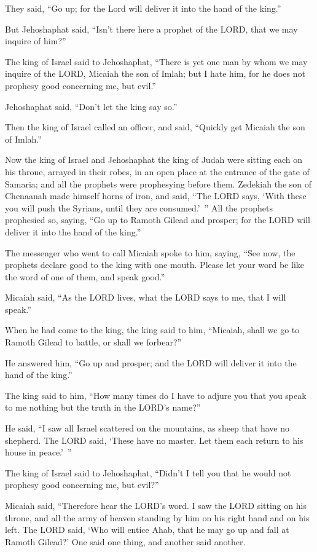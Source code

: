 They said, “Go up; for the Lord will deliver it into the hand of the king.”

\myverse{}But Jehoshaphat said, “Isn’t there here a prophet of the LORD,
that we may inquire of him?”

\myverse{}The king of Israel said to Jehoshaphat, “There is yet one man
by whom we may inquire of the LORD, Micaiah the son of Imlah; but I hate him, for he does not prophesy
good concerning me, but evil.”

Jehoshaphat said, “Don’t let the king say so.”

\myverse{}Then the king of Israel called an officer, and said, “Quickly
get Micaiah the son of Imlah.”

\myverse{}Now the king of Israel and Jehoshaphat the king of Judah were
sitting each on his throne, arrayed in their robes, in an open place at the entrance of the gate of Samaria;
and all the prophets were prophesying before them.
\myverse{}Zedekiah the son of Chenaanah made himself horns of iron, and said, “The
LORD says, ‘With these you will push the Syrians, until they are consumed.’ ”
\myverse{}All the prophets prophesied so, saying, “Go up to Ramoth Gilead and prosper;
for the LORD will deliver it into the hand of the king.”

\myverse{}The messenger who went to call Micaiah spoke to him, saying,
“See now, the prophets declare good to the king with one mouth. Please let your word be like the word
of one of them, and speak good.”

\myverse{}Micaiah said, “As the LORD lives, what the LORD says to me,
that I will speak.”

\myverse{}When he had come to the king, the king said to him, “Micaiah,
shall we go to Ramoth Gilead to battle, or shall we forbear?”

He answered him, “Go up and prosper; and the LORD will deliver it into the hand of the king.”

\myverse{}The king said to him, “How many times do I have to adjure you
that you speak to me nothing but the truth in the LORD’s name?”

\myverse{}He said, “I saw all Israel scattered on the mountains, as sheep
that have no shepherd. The LORD said, ‘These have no master. Let them each return to his house in peace.’ ”

\myverse{}The king of Israel said to Jehoshaphat, “Didn’t I tell you that
he would not prophesy good concerning me, but evil?”

\myverse{}Micaiah said, “Therefore hear the LORD’s word. I saw the LORD
sitting on his throne, and all the army of heaven standing by him on his right hand and on his left.
\myverse{}The LORD said, ‘Who will entice Ahab, that he may go up and fall at Ramoth
Gilead?’ One said one thing, and another said another.

